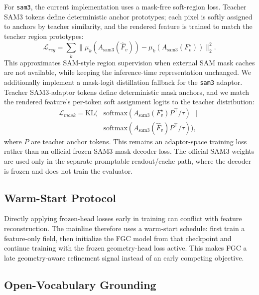 \documentclass[10pt,twocolumn,letterpaper]{article}
\begin{document}
For \texttt{sam3}, the current implementation uses a mask-free soft-region loss.
Teacher SAM3 tokens define deterministic anchor prototypes; each pixel is softly
assigned to anchors by teacher similarity, and the rendered feature is trained to
match the teacher region prototypes:
\begin{equation}
  \mathcal{L}_{reg}
  =
  \sum_k \|\mu_k(A_{\mathrm{sam3}}(\hat{F}_v))
  - \mu_k(A_{\mathrm{sam3}}(F_v^{\star}))\|_2^2.
\end{equation}
This approximates SAM-style region supervision when external SAM mask caches are
not available, while keeping the inference-time representation unchanged.
We additionally implement a mask-logit distillation fallback for the
\texttt{sam3} adaptor. Teacher SAM3-adaptor tokens define deterministic mask
anchors, and we match the rendered feature's per-token soft assignment logits to
the teacher distribution:
\begin{equation}
  \begin{aligned}
  \mathcal{L}_{mask}
  =
  \mathrm{KL}\!\Big(
  &\mathrm{softmax}(A_{\mathrm{sam3}}(F_v^\star)P^\top/\tau)
  \,\|\,\\
  &\mathrm{softmax}(A_{\mathrm{sam3}}(\hat{F}_v)P^\top/\tau)
  \Big),
  \end{aligned}
\end{equation}
where $P$ are teacher anchor tokens. This remains an adaptor-space training
loss rather than an official frozen SAM3 mask-decoder loss. The official SAM3
weights are used only in the separate promptable readout/cache path, where the
decoder is frozen and does not train the evaluator.

\subsection{Warm-Start Protocol}

Directly applying frozen-head losses early in training can conflict with feature
reconstruction. The mainline therefore uses a warm-start schedule: first train a
feature-only field, then initialize the FGC model from that checkpoint and
continue training with the frozen geometry-head loss active. This makes FGC a
late geometry-aware refinement signal instead of an early competing objective.

\subsection{Open-Vocabulary Grounding}
\end{document}
